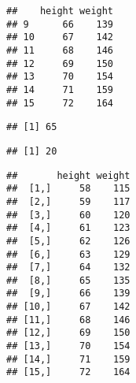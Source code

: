 \documentclass[
]{article}
\newenvironment{Shaded}{\begin{snugshade}}{\end{snugshade}}
\newcommand{\CommentTok}[1]{\textcolor[rgb]{0.56,0.35,0.01}{\textit{#1}}}
\newcommand{\DecValTok}[1]{\textcolor[rgb]{0.00,0.00,0.81}{#1}}
\newcommand{\FunctionTok}[1]{\textcolor[rgb]{0.13,0.29,0.53}{\textbf{#1}}}
\newcommand{\NormalTok}[1]{#1}
\newcommand{\OtherTok}[1]{\textcolor[rgb]{0.56,0.35,0.01}{#1}}
\newcommand{\SpecialCharTok}[1]{\textcolor[rgb]{0.81,0.36,0.00}{\textbf{#1}}}
\begin{document}
\begin{verbatim}
##    height weight
## 9      66    139
## 10     67    142
## 11     68    146
## 12     69    150
## 13     70    154
## 14     71    159
## 15     72    164
\end{verbatim}

\begin{Shaded}
\end{Shaded}

\begin{verbatim}
## [1] 65
\end{verbatim}

\begin{Shaded}
\end{Shaded}

\begin{verbatim}
## [1] 20
\end{verbatim}

\begin{Shaded}
\end{Shaded}

\begin{verbatim}
##       height weight
##  [1,]     58    115
##  [2,]     59    117
##  [3,]     60    120
##  [4,]     61    123
##  [5,]     62    126
##  [6,]     63    129
##  [7,]     64    132
##  [8,]     65    135
##  [9,]     66    139
## [10,]     67    142
## [11,]     68    146
## [12,]     69    150
## [13,]     70    154
## [14,]     71    159
## [15,]     72    164
\end{verbatim}
\end{document}
